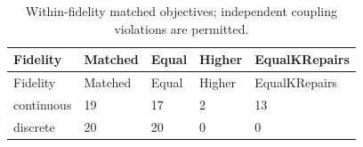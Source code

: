 \begingroup
\small
\begin{longtable}{lllll}
\caption{Within-fidelity matched objectives; independent coupling violations are permitted.}\label{tab:final20-quality}\\
\toprule
Fidelity & Matched & Equal & Higher & EqualKRepairs \\
\midrule
\endfirsthead
\toprule
Fidelity & Matched & Equal & Higher & EqualKRepairs \\
\midrule
\endhead
continuous & 19 & 17 & 2 & 13 \\
discrete & 20 & 20 & 0 & 0 \\
\bottomrule
\end{longtable}
\endgroup
